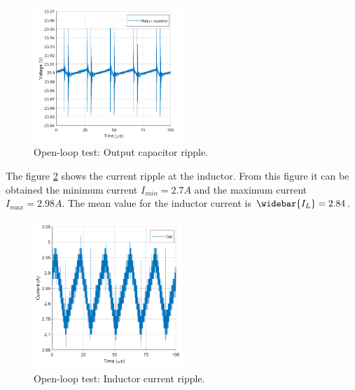 \begin{figure}[H]
	\begin{center}
		\includegraphics[width=0.5\textwidth]{../Pictures/P1/Test/Openloopoutputcapacitor}
		\caption{Open-loop test: Output capacitor ripple.}
		\label{Openlooptestoutputtcapacitor}
	\end{center}	
\end{figure}

The figure \ref{Openlooptestinductor} shows the current ripple at the inductor. From this figure it can be obtained  the minimum current $I_{min} = 2.7A$ and the maximum current $I_{max} = 2.98A$. The mean value for the inductor current is $\widebar{I_L}= 2.84$.

\begin{figure}[H]
	\begin{center}
		\includegraphics[width=0.5\textwidth]{../Pictures/P1/Test/Openloopinductor}
		\caption{Open-loop test: Inductor current ripple.}
		\label{Openlooptestinductor}
	\end{center}	
\end{figure}
